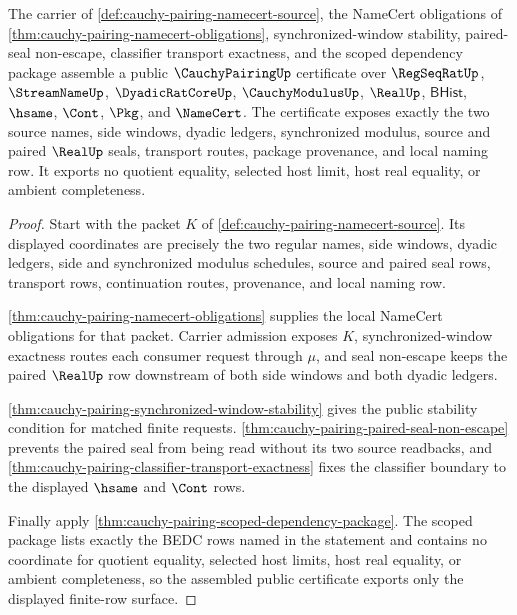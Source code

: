 \begin{theorem}
\label{thm:cauchy-pairing-public-export-certificate}
The carrier of \autoref{def:cauchy-pairing-namecert-source}, the NameCert obligations of \autoref{thm:cauchy-pairing-namecert-obligations}, synchronized-window stability, paired-seal non-escape, classifier transport exactness, and the scoped dependency package assemble a public $\CauchyPairingUp$ certificate over $\RegSeqRatUp$, $\StreamNameUp$, $\DyadicRatCoreUp$, $\CauchyModulusUp$, $\RealUp$, $\mathsf{BHist}$, $\hsame$, $\Cont$, $\Pkg$, and $\NameCert$. The certificate exposes exactly the two source names, side windows, dyadic ledgers, synchronized modulus, source and paired $\RealUp$ seals, transport routes, package provenance, and local naming row. It exports no quotient equality, selected host limit, host real equality, or ambient completeness.
\end{theorem}
\begin{proof}
Start with the packet $K$ of \autoref{def:cauchy-pairing-namecert-source}. Its displayed coordinates are precisely the two regular names, side windows, dyadic ledgers, side and synchronized modulus schedules, source and paired seal rows, transport rows, continuation routes, provenance, and local naming row.

\autoref{thm:cauchy-pairing-namecert-obligations} supplies the local NameCert obligations for that packet. Carrier admission exposes $K$, synchronized-window exactness routes each consumer request through $\mu$, and seal non-escape keeps the paired $\RealUp$ row downstream of both side windows and both dyadic ledgers.

\autoref{thm:cauchy-pairing-synchronized-window-stability} gives the public stability condition for matched finite requests. \autoref{thm:cauchy-pairing-paired-seal-non-escape} prevents the paired seal from being read without its two source readbacks, and \autoref{thm:cauchy-pairing-classifier-transport-exactness} fixes the classifier boundary to the displayed $\hsame$ and $\Cont$ rows.

Finally apply \autoref{thm:cauchy-pairing-scoped-dependency-package}. The scoped package lists exactly the BEDC rows named in the statement and contains no coordinate for quotient equality, selected host limits, host real equality, or ambient completeness, so the assembled public certificate exports only the displayed finite-row surface.
\end{proof}

